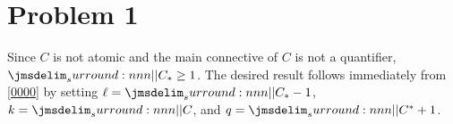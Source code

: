 \documentclass[a4paper]{article}
\begin{document}
\section*{Problem 1}
\label{0001}

Since $C$ is not atomic and the main connective of $C$ is not a quantifier, $\dRank{C} \geq 1$.
The desired result follows immediately from \cref{0000} by setting $\ell = \dRank{C} - 1$, $k = \cRank{C}$, and $q = \qRank{C} + 1$.

% 
% 
\end{document}
